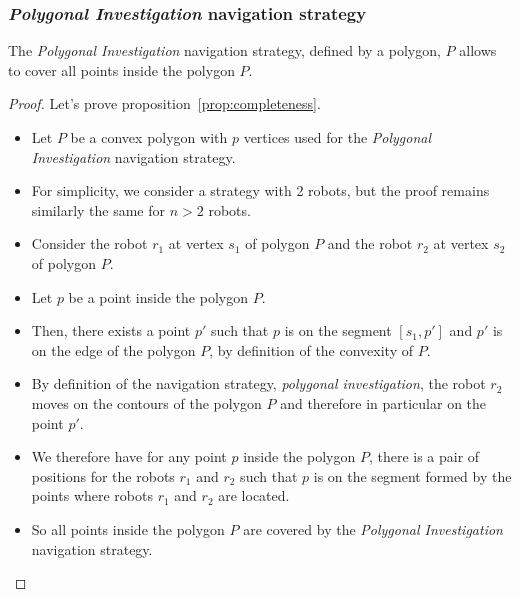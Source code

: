 \documentclass[english,RandD]{rapportPFE}  %
\begin{document}
			\subsubsection*{\textit{Polygonal Investigation} navigation strategy}
				\begin{Proposition}
					The \textit{Polygonal Investigation} navigation strategy, defined by a polygon, $P$ allows to cover all points inside the polygon $P$.
					\label{prop:completeness}
				\end{Proposition}
				\begin{proof}
					Let's prove proposition~\ref{prop:completeness}.
					\begin{itemize}
						\item Let $P$ be a convex polygon with $p$ vertices used for the \textit{Polygonal Investigation} navigation strategy.
						\item For simplicity, we consider a strategy with 2 robots, but the proof remains similarly the same for $n > 2$ robots.
						\item Consider the robot $r_1$ at vertex $s_1$ of polygon $P$ and the robot $r_2$ at vertex $s_2$ of polygon $P$.
						\item Let $p$ be a point inside the polygon $P$.
						\item Then, there exists a point $p'$ such that $p$ is on the segment $[s_1, p']$ and $p'$ is on the edge of the polygon $P$, by definition of the convexity of $P$.
						\item By definition of the navigation strategy, \textit{polygonal investigation}, the robot $r_2$ moves on the contours of the polygon $P$ and therefore in particular on the point $p'$.
						\item We therefore have for any point $p$ inside the polygon $P$, there is a pair of positions for the robots $r_1$ and $r_2$ such that $p$ is on the segment formed by the points where robots $r_1$ and $r_2$ are located.
						\item So all points inside the polygon $P$ are covered by the \textit{Polygonal Investigation} navigation strategy.
					\end{itemize}
				\end{proof}
\end{document}
